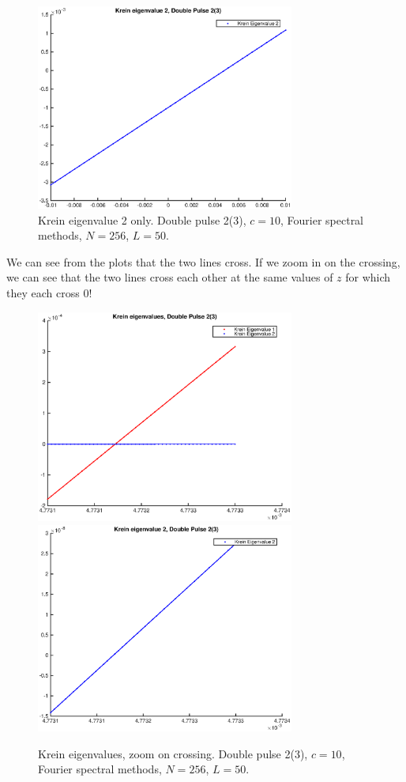 \documentclass[12pt]{article}
\begin{document}
\begin{figure}[H]
	\includegraphics[width=8.5cm]{dp2kreineig2}
	\caption{Krein eigenvalue 2 only. Double pulse 2(3), $c = 10$, Fourier spectral methods, $N = 256$, $L = 50$. }
\end{figure}

We can see from the plots that the two lines cross. If we zoom in on the crossing, we can see that the two lines cross each other at the same values of $z$ for which they each cross 0!

\begin{figure}[H]
	\includegraphics[width=8.5cm]{dp2kreineig1zoom}
	\includegraphics[width=8.5cm]{dp2kreineig2zoom}
	\caption{Krein eigenvalues, zoom on crossing. Double pulse 2(3), $c = 10$, Fourier spectral methods, $N = 256$, $L = 50$.}
\end{figure}
\end{document}
